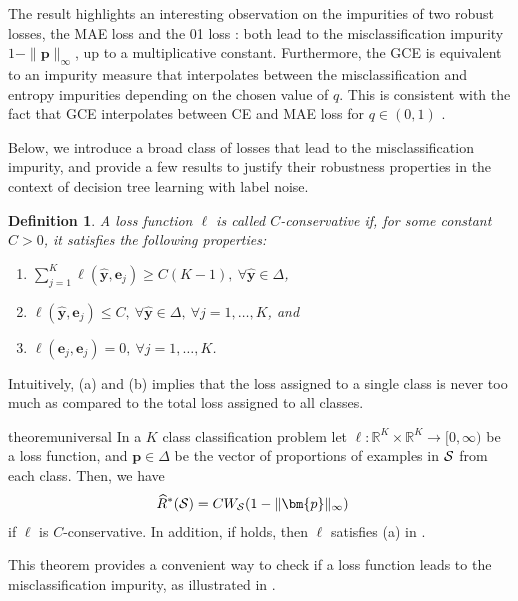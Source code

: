 \documentclass[letterpaper]{article} %
\newcommand{\R}{{\mathbb{R}}}
\newcommand{\bp}{{\bm{p}}}
\newcommand{\by}{{\bm{y}}}
\newcommand{\be}{{\bm{e}}}
\newcommand{\cS}{{\cal{S}}}
\newcommand{\WS}{{W_{\cal{S}}}}
\newcommand{\simplex}{\Delta}
\newcommand{\argmax}{\mathrm{argmax}}
\newtheorem{defn}{Definition}
\begin{document}
The result highlights an interesting observation on the impurities of 
two robust losses, the MAE loss and the 01 loss \cite{ghosh2017robust}:
both lead to the misclassification impurity 
$1 - \|\bp\|_{\infty}$, up to a multiplicative constant.
Furthermore, the GCE is equivalent to an impurity measure that interpolates
between the misclassification and entropy impurities depending on the chosen
value of $q$. 
This is consistent with the fact that GCE interpolates between CE and MAE loss
for $q \in (0, 1)$ \cite{zhang2018generalized}.

Below, we introduce a broad class of losses that lead to the misclassification
impurity, and provide a few results to justify their robustness properties in
the context of decision tree learning with label noise.
\begin{defn} \label{defn:conservative}
A loss function $\ell$ is called \emph{$C$-conservative} if,
for some constant $C>0$,
it satisfies the following properties:
\begin{enumerate}
	\item[(a)] $\sum_{j=1}^K\ell(\widehat{\by},\be_j) \geq C(K-1),\ 
		\forall\widehat{\by}\in \simplex$,
	\item[(b)] $\ell(\widehat{\by},\be_j)\leq C,\ 
		\forall\widehat{\by}\in \simplex,\ \forall j=1,\ldots,K$, and
	\item[(c)] $\ell(\be_j,\be_j)=0,\ \forall j=1,\ldots,K$.
\end{enumerate}
\end{defn}
Intuitively, (a) and (b) implies that the loss assigned to a single class is
never too much as compared to the total loss assigned to all classes.

\begin{restatable}{theorem}{universal}
\label{thm:universal} 
    In a $K$ class classification problem let $\ell:\R^K\times \R^K\to [0,\infty)$ be a loss function, 
    and
		$\bp\in\simplex$ be the vector of proportions of examples in $\cS$ from each class. 
		Then, we have 
    \begin{align}
        \widehat{R}^*(\cS) &= C\WS (1-\|\bp\|_\infty) \label{eq:misclassification_impurity}
    \end{align}
    if $\ell$ is $C$-conservative.
    In addition, if  holds, then $\ell$ satisfies (a)
    in \Cref{defn:conservative}.
\end{restatable}
This theorem provides a convenient way to check if a loss function leads to the
misclassification impurity, as illustrated in . 
\end{document}
